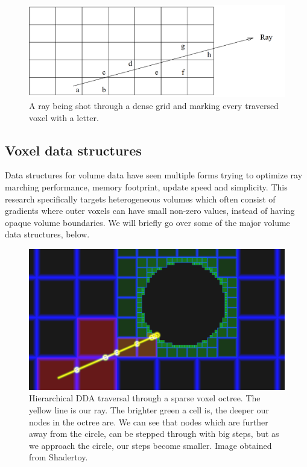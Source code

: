 \clearpage

\begin{figure}
    \centering
    \includegraphics[width=\linewidth]{figures/dda.png}
    \caption{A ray being shot through a dense grid and marking every traversed voxel with a letter. \cite{amanatides1987fast}}
    \label{fig:dda_traversal}
\end{figure}

\subsection{Voxel data structures} \label{introduction:voxel_data_structures}
Data structures for volume data have seen multiple forms trying to optimize ray marching performance, memory footprint, update speed and simplicity. This research specifically targets heterogeneous volumes which often consist of gradients where outer voxels can have small non-zero values, instead of having opaque volume boundaries. We will briefly go over some of the major volume data structures, below.

\begin{figure}
    \centering
    \includegraphics[width=\linewidth]{figures/esvo_traversal.png}
    \caption{Hierarchical DDA traversal through a sparse voxel octree. The yellow line is our ray. The brighter green a cell is, the deeper our nodes in the octree are. We can see that nodes which are further away from the circle, can be stepped through with big steps, but as we approach the circle, our steps become smaller. Image obtained from Shadertoy.}
    \label{fig:esvo}
\end{figure}

